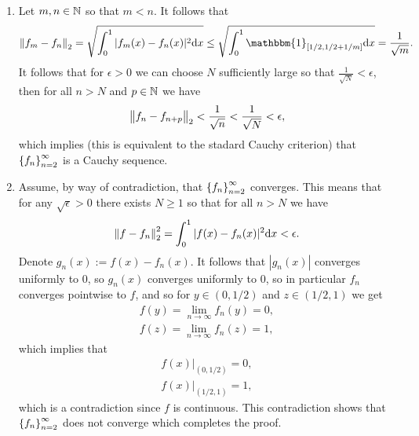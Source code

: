 \documentclass[11pt,a4paper]{article}
\begin{document}
\begin{solution} \phantom{}
  \begin{enumerate}
    \item[(1)] Let $m,n \in \mathbb{N}$ so that $m < n$.
      It follows that
      \[
        \norm{f_m - f_n}_2 =
        \sqrt{\int_{0}^{1} |f_m(x) - f_n(x)|^2 \dx} \le
        \sqrt{\int_{0}^{1} \mathbbm{1}_{[1/2,1/2+1/m]} \dx} =
        \frac{1}{\sqrt{m}}.
      \]
      It follows that for $\epsilon > 0$ we can choose $N$ sufficiently
      large so that $\frac{1}{\sqrt{N}} < \epsilon$,
      then for all $n > N$ and $p \in \mathbb{N}$ we have
      \[
        \left\lVert f_n - f_{n+p}\right\rVert_2 <
        \frac{1}{\sqrt{n}} <
        \frac{1}{\sqrt{N}} <
        \epsilon,
      \]
      which implies (this is equivalent to the stadard Cauchy criterion)
      that $\left\{f_n\right\}_{n=2}^{\infty}$ is a Cauchy sequence.
      
    \item[(2)] Assume, by way of contradiction,
      that $\left\{f_n\right\}_{n=2}^{\infty}$
      converges.
      This means that for any
      $\sqrt{\epsilon} > 0$ there exists $N \geq 1$ so that
      for all $n > N$ we have
      \[
        \norm{f - f_n}_2^2 =
        \int_{0}^{1} |f(x) - f_n(x)|^2 \dx < \epsilon.
      \]
      Denote $g_n(x) := f(x) - f_n(x)$.
      It follows that $|g_n(x)|$ converges uniformly to $0$,
      so $g_n(x)$ converges uniformly to $0$,
      so in particular $f_n$ converges pointwise to $f$, and so
      for $y \in (0,1/2)$ and $z \in (1/2,1)$ we get
      \begin{align*}
        f(y) = \lim_{n \to \infty} f_n(y) = 0, \\
        f(z) = \lim_{n \to \infty} f_n(z) = 1,
      \end{align*}
      which implies that
      \begin{align*}
        f(x)\vert_{(0,1/2)} = 0, \\
        f(x)\vert_{(1/2,1)} = 1,
      \end{align*}
      which is a contradiction since $f$ is continuous.
      This contradiction shows that $\left\{f_n\right\}_{n=2}^{\infty}$
      does not converge which completes the proof.
  \end{enumerate}
\end{solution}
\end{document}
